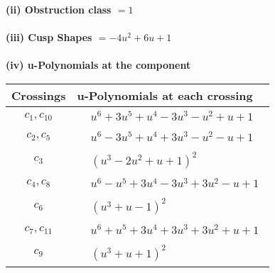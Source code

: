 \documentclass[1p]{elsarticle_modified}
\theoremstyle{definition}
\begin{document}
\flushleft \textbf{(ii) Obstruction class $= 1$}\\~\\
\flushleft \textbf{(iii) Cusp Shapes $= -4 u^2+6 u+1$}\\~\\
\newpage\renewcommand{\arraystretch}{1}
\flushleft \textbf{(iv) u-Polynomials at the component}\newline \\
\begin{tabular}{m{50pt}|m{274pt}}
Crossings & \hspace{64pt}u-Polynomials at each crossing \\
\hline $$\begin{aligned}c_{1},c_{10}\end{aligned}$$&$\begin{aligned}
&u^6+3 u^5+u^4-3 u^3- u^2+u+1
\end{aligned}$\\
\hline $$\begin{aligned}c_{2},c_{5}\end{aligned}$$&$\begin{aligned}
&u^6-3 u^5+u^4+3 u^3- u^2- u+1
\end{aligned}$\\
\hline $$\begin{aligned}c_{3}\end{aligned}$$&$\begin{aligned}
&(u^3-2 u^2+u+1)^2
\end{aligned}$\\
\hline $$\begin{aligned}c_{4},c_{8}\end{aligned}$$&$\begin{aligned}
&u^6- u^5+3 u^4-3 u^3+3 u^2- u+1
\end{aligned}$\\
\hline $$\begin{aligned}c_{6}\end{aligned}$$&$\begin{aligned}
&(u^3+u-1)^2
\end{aligned}$\\
\hline $$\begin{aligned}c_{7},c_{11}\end{aligned}$$&$\begin{aligned}
&u^6+u^5+3 u^4+3 u^3+3 u^2+u+1
\end{aligned}$\\
\hline $$\begin{aligned}c_{9}\end{aligned}$$&$\begin{aligned}
&(u^3+u+1)^2
\end{aligned}$\\
\hline
\end{tabular}\\~\\
\end{document}
